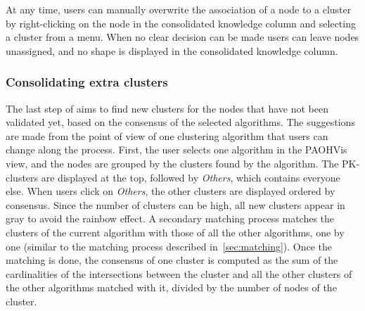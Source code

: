 \begin{description}[leftmargin=0pt,nosep]

\item [Direct tagging.] At any time, users can manually overwrite the association of a node to a cluster by right-clicking on the node in the consolidated knowledge column and selecting a cluster from a menu.
When no clear decision can be made users can leave nodes unassigned, and no shape is displayed in the consolidated knowledge column.
\end{description}



\subsubsection{Consolidating extra clusters}

The last step of \pkclustering aims to find new clusters for the nodes that have not been validated yet, based on the consensus of the selected algorithms. The suggestions are made from the point of view of one clustering algorithm that users can change along the process.
First, the user selects one algorithm in the PAOHVis view, and the nodes are grouped by the clusters found by the algorithm.
The PK-clusters are displayed at the top, followed by \emph{Others}, which contains everyone else. When users click on \emph{Others}, the other clusters are displayed ordered by consensus. Since the number of clusters can be high, all new clusters appear in gray to avoid the rainbow effect. A secondary matching process matches the clusters of the current algorithm with those of all the other algorithms, one by one (similar to the matching process described in~\autoref{sec:matching}). Once the matching is done, the consensus of one cluster is computed as the sum of the cardinalities of the intersections between the cluster and all the other clusters of the other algorithms matched with it, divided by the number of nodes of the cluster.

